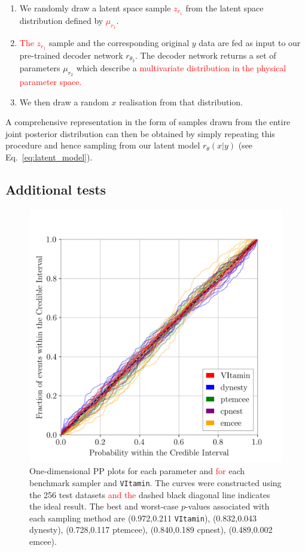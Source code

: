 \documentclass[%
showpacs,
nofootinbib,
 amsmath,amssymb,
 aps,
 twocolumn,
 prl,
 reprint,
floatfix,
]{revtex4-1}
\newcommand{\new}[1]{\textcolor{red}{#1}}
\begin{document}
%
%
\begin{enumerate}
%
\item We randomly draw a latent space sample \new{$z_{r_1}$} from the latent space
distribution defined by \new{$\mu_{r_1}$}.
%
\item \new{The $z_{r_1}$} sample and the corresponding original $y$ data are fed as input to our
pre-trained decoder network $r_{\theta_2}$. The decoder network returns a set
of parameters $\mu_{r_2}$ which describe a \new{multivariate distribution in the physical
parameter space.}
%
\item We then draw a random $x$ realisation from that distribution.
%
\end{enumerate}
%

%
%
A comprehensive representation in the form of samples drawn from the entire
joint posterior distribution can then be obtained by simply repeating this
procedure and hence sampling from our latent model $r_{\theta}(x|y)$ (see
Eq.~\ref{eq:latent_model}).

\subsection{Additional tests}
%
%
\begin{figure}
    \includegraphics[width=\columnwidth]{latest_pp_plot.png}
    \caption{\label{fig:pp_plot} One-dimensional \ac{PP} plots for each
parameter and \new{for} each benchmark sampler and \texttt{VItamin}. The curves were
constructed using the 256 test datasets \new{and the} dashed black diagonal line
indicates the ideal result. The best and worst-case $p$-values associated with each
sampling method are (0.972,0.211 \texttt{VItamin}), (0.832,0.043 dynesty), (0.728,0.117
ptemcee), (0.840,0.189 cpnest), (0.489,0.002 emcee). 
}
\end{figure}
%
\end{document}
